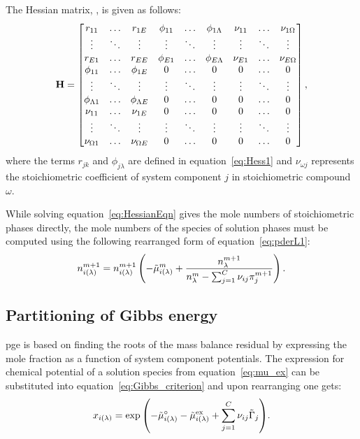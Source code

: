 The Hessian matrix, \Hessian, is given as follows:
\begin{equation}\label{eq:GEM_mat}
\mathbf{H} =
    \begin{bmatrix}
      r_{11} & \dots & r_{1E} & \phi_{11} & \dots & \phi_{1\Lambda} & \nu_{11} & \dots & \nu_{1\Omega} \\
      \vdots & \ddots & \vdots & \vdots & \ddots & \vdots & \vdots & \ddots & \vdots \\
      r_{E1} & \dots & r_{EE} & \phi_{E1} & \dots & \phi_{E\Lambda} & \nu_{E1} & \dots & \nu_{E\Omega} \\
      \phi_{11} & \dots & \phi_{1E} & 0 & \dots & 0 & 0 & \dots & 0 \\
      \vdots & \ddots & \vdots & \vdots & \ddots & \vdots & \vdots & \ddots & \vdots \\
      \phi_{\Lambda1} & \dots & \phi_{\Lambda E} & 0 & \dots & 0 & 0 & \dots & 0 \\
      \nu_{11} & \dots & \nu_{1E} & 0 & \dots & 0 & 0 & \dots & 0 \\
      \vdots & \ddots & \vdots & \vdots & \ddots & \vdots & \vdots & \ddots & \vdots \\
      \nu_{\Omega 1} & \dots & \nu_{\Omega E} & 0 & \dots & 0 & 0 & \dots & 0 \\
    \end{bmatrix},
\end{equation}
where the terms $r_{jk}$ and $\phi_{j\lambda}$ are defined in equation~\eqref{eq:Hess1} and $\nu_{\omega j}$ represents the stoichiometric coefficient of system component $j$ in stoichiometric compound $\omega$.

While solving equation~\eqref{eq:HessianEqn} gives the mole numbers of stoichiometric phases directly, the mole numbers of the species of solution phases must be computed using the following rearranged form of equation~\eqref{eq:pderL1}:
\begin{equation}
  n_{i(\lambda)}^{m+1} = n_{i(\lambda)}^{m+1}\left(-\tilde{\mu}_{i(\lambda)}^m + \frac{n_\lambda^{m+1}}{n_\lambda^{m} - \sum_{j = 1}^{C}\nu_{ij} \pi_j^{m+1}}\right).
\end{equation}

\subsection{Partitioning of Gibbs energy}
\gls{pge} is based on finding the roots of the mass balance residual by expressing the mole fraction as a function of system component potentials. The expression for chemical potential of a solution species from equation~\eqref{eq:mu_ex} can be substituted into equation~\eqref{eq:Gibbs_criterion} and upon rearranging one gets:
    \begin{equation}
        x_{i(\lambda)} = \exp{\left(-\ensuremath{\tilde{\mu}_{i(\lambda)}^{\circ}} - \ensuremath{\tilde{\mu}_{i(\lambda)}^\text{ex}} +  \ensuremath{\sum_{j = 1}^{C}} \ensuremath{\nu_{ij}} \ensuremath{\tilde{\Gamma}_{j}}\right)}.
    \end{equation}

